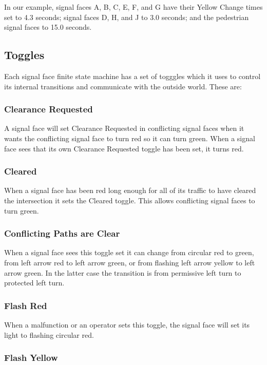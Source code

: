 \documentclass[letterpaper,twoside]{article}
\begin{document}
In our example, signal faces A, B, C, E, F, and G have their Yellow Change
times set to 4.3 seconds; signal faces D, H, and J to 3.0 seconds;
and the pedestrian signal faces to 15.0 seconds.

\subsection{Toggles}

Each signal face finite state machine has a set of togggles which it uses
to control its internal transitions and communicate with the
outside world.  These are:

\subsubsection{Clearance Requested}

A signal face will set Clearance Requested in conflicting signal faces
when it wants the conflicting signal face to turn red so it can turn green.
When a signal face sees that its own Clearance Requested toggle has been
set, it turns red.

\subsubsection{Cleared}

When a signal face has been red long enough for all of its traffic
to have cleared the intersection it sets the Cleared toggle.
This allows conflicting signal faces to turn green.

\subsubsection{Conflicting Paths are Clear}

When a signal face sees this toggle set it can change from circular red
to green, from left arrow red to left arrow green, or from flashing
left arrow yellow to left arrow green.
In the latter case the transition is from permissive left turn to
protected left turn.

\subsubsection{Flash Red}

When a malfunction or an operator sets this toggle, the signal face
will set its light to flashing circular red.

\subsubsection{Flash Yellow}
\end{document}
